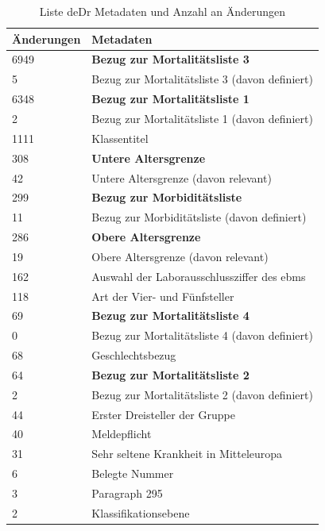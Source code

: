 \begin{table}[ht]
	\centering
	\small
	\caption[Änderungen in den Metadaten]{Liste deDr Metadaten und Anzahl an Änderungen}
	\label{tab:icdupd}
	\begin{tabular}{|l|p{12cm}|}
		\hline
		\rowcolor{lightgray} Änderungen & Metadaten \\ \hline
		6949 & \textbf{Bezug zur Mortalitätsliste 3} \\ \hline		
		5 & Bezug zur Mortalitätsliste 3 (davon definiert) \\ \hline
		6348 & \textbf{Bezug zur Mortalitätsliste 1} \\ \hline
		2 & Bezug zur Mortalitätsliste 1 (davon definiert) \\ \hline
		1111 & Klassentitel \\ \hline
		308 & \textbf{Untere Altersgrenze} \\ \hline
		42 & Untere Altersgrenze (davon relevant) \\ \hline
		299 & \textbf{Bezug zur Morbiditätsliste} \\ \hline
		11 & Bezug zur Morbiditätsliste (davon definiert) \\ \hline
		286 & \textbf{Obere Altersgrenze} \\ \hline
		19 & Obere Altersgrenze (davon relevant) \\ \hline
		162 & Auswahl der Laborausschlussziffer des \acp{ebm}  \\ \hline
		118 & Art der Vier- und Fünfsteller \\ \hline
		69 & \textbf{Bezug zur Mortalitätsliste 4} \\ \hline
		0 & Bezug zur Mortalitätsliste 4 (davon definiert) \\ \hline
		68 & Geschlechtsbezug \\ \hline
		64 & \textbf{Bezug zur Mortalitätsliste 2} \\ \hline
		2 & Bezug zur Mortalitätsliste 2 (davon definiert) \\ \hline
		44 & Erster Dreisteller der Gruppe \\ \hline		
		40 & Meldepflicht \\ \hline
		31 & Sehr seltene Krankheit in Mitteleuropa \\ \hline				
		6 & Belegte Nummer \\ \hline
		3 & Paragraph 295 \\ \hline			
		2 & Klassifikationsebene \\ \hline
	\end{tabular}
\end{table}



